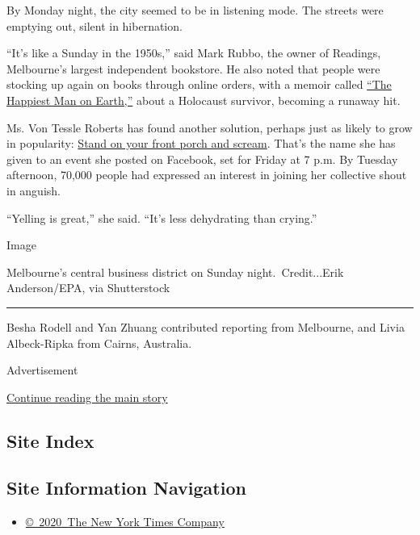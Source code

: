 By Monday night, the city seemed to be in listening mode. The streets
were emptying out, silent in hibernation.

``It's like a Sunday in the 1950s,'' said Mark Rubbo, the owner of
Readings, Melbourne's largest independent bookstore. He also noted that
people were stocking up again on books through online orders, with a
memoir called
\href{https://www.readings.com.au/products/32836563/the-happiest-man-on-earth}{``The
Happiest Man on Earth,''} about a Holocaust survivor, becoming a runaway
hit.

Ms. Von Tessle Roberts has found another solution, perhaps just as
likely to grow in popularity:
\href{https://www.facebookcorewwwi.onion/events/2738223623055680/}{Stand
on your front porch and scream}. That's the name she has given to an
event she posted on Facebook, set for Friday at 7 p.m. By Tuesday
afternoon, 70,000 people had expressed an interest in joining her
collective shout in anguish.

``Yelling is great,'' she said. ``It's less dehydrating than crying.''

Image

Melbourne's central business district on Sunday night.~Credit...Erik
Anderson/EPA, via Shutterstock

\begin{center}\rule{0.5\linewidth}{\linethickness}\end{center}

Besha Rodell and Yan Zhuang contributed reporting from Melbourne, and
Livia Albeck-Ripka from Cairns, Australia.

Advertisement

\protect\hyperlink{after-bottom}{Continue reading the main story}

\hypertarget{site-index}{%
\subsection{Site Index}\label{site-index}}

\hypertarget{site-information-navigation}{%
\subsection{Site Information
Navigation}\label{site-information-navigation}}

\begin{itemize}
\tightlist
\item
  \href{https://help.nytimes3xbfgragh.onion/hc/en-us/articles/115014792127-Copyright-notice}{©~2020~The
  New York Times Company}
\end{itemize}

